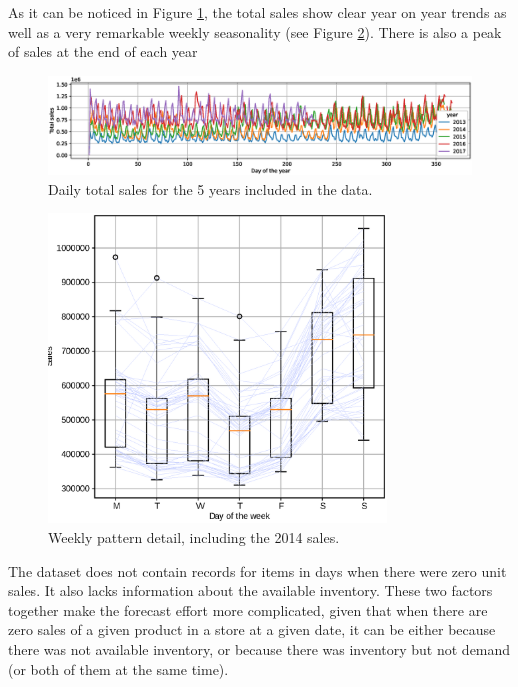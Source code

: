 As it can be noticed in Figure \ref{fig:timeseries}, the total sales show clear year on year trends as well as a very remarkable weekly seasonality (see Figure \ref{fig:timeseries_detail}). There is also a peak of sales at the end of each year

 	\begin{figure}[h]
 	\centering
 	\includegraphics[width=1\textwidth]{salesforecast/images/timeseries}
 	\caption[Daily total sales for the 5 years included in the data]{Daily total sales for the 5 years included in the data.}
 	\label{fig:timeseries}
\end{figure}

\begin{figure}[h]
	\centering
	\includegraphics[width=0.8\textwidth]{salesforecast/images/timeseries_dow}
	\caption[Weekly sales pattern details]{Weekly pattern detail, including the 2014 sales.}
	\label{fig:timeseries_detail}
\end{figure}

The dataset does not contain records for items in days when there were zero unit sales. It also lacks information about the available inventory. These two factors together make the forecast effort more complicated, given that when there are zero sales of a given product in a store at a given date, it can be either because there was not available inventory, or because there was inventory but not demand (or both of them at the same time).

